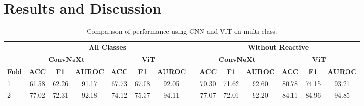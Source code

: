 \documentclass[runningheads]{llncs}
\begin{document}
\section{Results and Discussion}

\begin{table}[b]
\caption{Comparison of performance using CNN and ViT on multi-class.}
\label{tab:multiclass}
\setlength{\tabcolsep}{1pt} %
{\fontsize{8}{12}\selectfont 

\begin{tabular}{@{}lccccccccccccc@{}}
\toprule
                                  & \multicolumn{6}{c}{\textbf{All Classes}}                                                                                                                                &           & \multicolumn{6}{c}{\textbf{Without Reactive}}                                                                                                                       \\ \cmidrule(r){1-7} \cmidrule(l){9-14} 
\multicolumn{1}{c}{\textbf{}}     & \multicolumn{3}{c|}{\textbf{ConvNeXt}}                                                                             & \multicolumn{3}{c}{\textbf{ViT}}                   & \textbf{} & \multicolumn{3}{c|}{\textbf{ConvNeXt}}                                                                             & \multicolumn{3}{c}{\textbf{ViT}}               \\ \cmidrule(lr){2-7} \cmidrule(l){9-14} 
\multicolumn{1}{c}{\textbf{Fold}} & \textbf{ACC}                  & \textbf{F1}                   & \multicolumn{1}{c|}{\textbf{AUROC}}                & \textbf{ACC}    & \textbf{F1}     & \textbf{AUROC} &           & \textbf{ACC}                  & \textbf{F1}                   & \multicolumn{1}{c|}{\textbf{AUROC}}                & \textbf{ACC} & \textbf{F1}    & \textbf{AUROC} \\ \cmidrule(r){1-7} \cmidrule(l){9-14} 
1                                 & 61.58                         & 62.26                         & \multicolumn{1}{c|}{91.17}                         & 67.73           & 67.08           & 92.05          &           & 70.30                          & 71.62                         & \multicolumn{1}{c|}{92.60}                          & 80.78        & 74.15          & 93.21          \\
2                                 & 77.02                         & 72.31                         & \multicolumn{1}{c|}{92.18}                         & 74.12           & 75.37           & 94.11          &           & 77.07                         & 72.01                         & \multicolumn{1}{c|}{92.20}                          & 84.11        & 84.96          & 94.85          \\

\end{tabular}}
\end{table}
\end{document}

